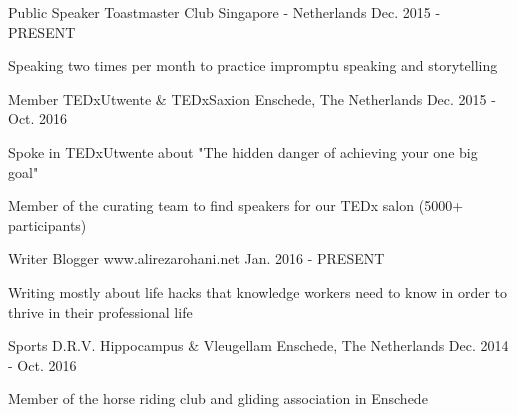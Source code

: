 

\begin{cventries}

  \cventry
    {Public Speaker} %
    {Toastmaster Club} %
    {Singapore - Netherlands} %
    {Dec. 2015 - PRESENT} %
    {
      \begin{cvitems} %
        \item {Speaking two times per month to practice impromptu speaking and storytelling}
      \end{cvitems}
    }

  \cventry
    {Member} %
    {TEDxUtwente \& TEDxSaxion} %
    {Enschede, The Netherlands} %
    {Dec. 2015 - Oct. 2016} %
    {
      \begin{cvitems} %
        \item {Spoke in TEDxUtwente about "The hidden danger of achieving your one big goal" }
        \item {Member of the curating team to find speakers for our TEDx salon (5000+ participants)}
      \end{cvitems}
    }

  \cventry
    {Writer} %
    {Blogger} %
    {www.alirezarohani.net} %
    {Jan. 2016 - PRESENT} %
    {
      \begin{cvitems} %
        \item {Writing mostly about life hacks that knowledge workers need to know in order to thrive in their professional life}
       \end{cvitems}
    }

  \cventry
    {Sports} %
    {D.R.V. Hippocampus \& Vleugellam } %
    {Enschede, The Netherlands} %
    {Dec. 2014 - Oct. 2016} %
    {
      \begin{cvitems} %
        \item {Member of the horse riding club and gliding association in Enschede }
      \end{cvitems}
    }

\end{cventries}
